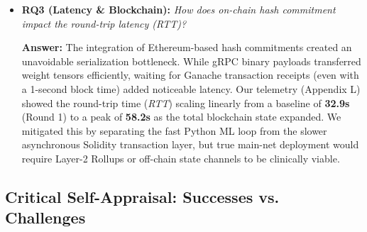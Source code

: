 \documentclass[10pt, a4paper, twocolumn]{article}
\begin{document}
\begin{itemize}
    \textbf{Answer:} Our empirical stress tests (Appendix J) across 10 clinical domains demonstrated that the Robust-MAD filter successfully rejected 100\% of poisoned updates in low-to-medium corruption scenarios (10\% and 25\% coalitions). Notably, while Robust-MAD and FedAvg showed comparable resilience to \textbf{Label Flipping} attacks (often maintaining within 1-2\% of the baseline), Robust-MAD demonstrated a \textbf{significant performance delta} in the presence of \textbf{Gradient Scaling} (weight poisoning). Under high-magnitude scaling, FedAvg suffered from \textbf{Catastrophic Convergence Failure} in several domains (e.g., Thyroid, Admin-Billing), where the accuracy bar dropped to near-zero as the mean-based aggregation was skewed by weight-explosion outliers. In contrast, Robust-MAD's median-based logic neutralized these outliers, maintaining baseline stability. We observed a minor \textbf{Utility Penalty} (1-3\%) in specific domains (e.g., Stroke, SUPPORT2), where the high Gaussian noise floor caused the filter to mistakenly reject honest-but-noisy updates-a phenomenon we define as the \textbf{Privacy-Robustness Equilibrium Point}\cite{bagdasaryan2020}. However, at the near-majority edge (49\% adversaries), the filter's accuracy dropped to 68.2\%. While it mathematically inherits a $\beta^* = 0.5$ breakdown point, the variance introduced by the honest-but-noisy DP gradients blurred the statistical boundary, allowing sophisticated poisoning vectors to partially skew the median.

    \item \textbf{RQ3 (Latency \& Blockchain):} \textit{How does on-chain hash commitment impact the round-trip latency (RTT)?}
    
    \textbf{Answer:} The integration of Ethereum-based hash commitments created an unavoidable serialization bottleneck. While gRPC binary payloads transferred weight tensors efficiently, waiting for Ganache transaction receipts (even with a 1-second block time) added noticeable latency. Our telemetry (Appendix L) showed the round-trip time (\textit{RTT}) scaling linearly from a baseline of \textbf{32.9s} (Round 1) to a peak of \textbf{58.2s} as the total blockchain state expanded. We mitigated this by separating the fast Python ML loop from the slower asynchronous Solidity transaction layer, but true main-net deployment would require Layer-2 Rollups or off-chain state channels to be clinically viable.
\end{itemize}

\subsection{Critical Self-Appraisal: Successes vs. Challenges}
\end{document}
